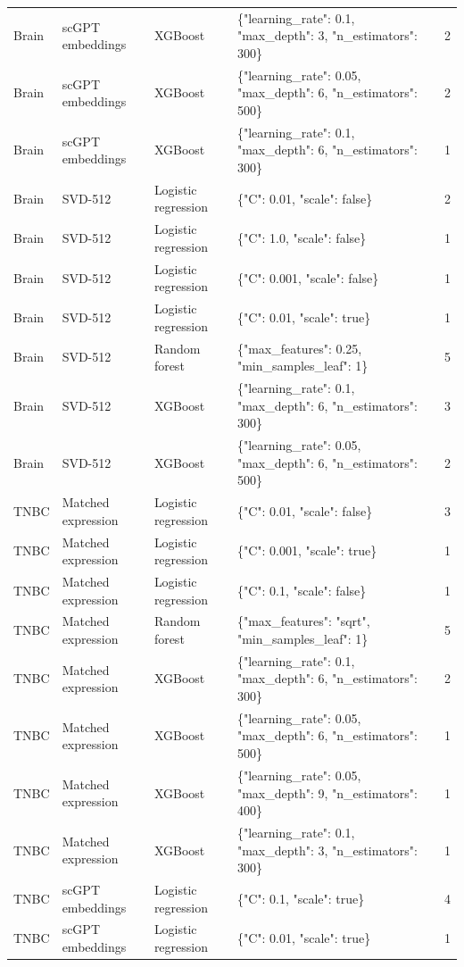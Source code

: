 {\begin{longtable}{lll>{\raggedright\arraybackslash}p{6.8cm}r}
Brain & scGPT embeddings & XGBoost & \{"learning\_rate": 0.1, "max\_depth": 3, "n\_estimators": 300\} & 2 \\
Brain & scGPT embeddings & XGBoost & \{"learning\_rate": 0.05, "max\_depth": 6, "n\_estimators": 500\} & 2 \\
Brain & scGPT embeddings & XGBoost & \{"learning\_rate": 0.1, "max\_depth": 6, "n\_estimators": 300\} & 1 \\
Brain & SVD-512 & Logistic regression & \{"C": 0.01, "scale": false\} & 2 \\
Brain & SVD-512 & Logistic regression & \{"C": 1.0, "scale": false\} & 1 \\
Brain & SVD-512 & Logistic regression & \{"C": 0.001, "scale": false\} & 1 \\
Brain & SVD-512 & Logistic regression & \{"C": 0.01, "scale": true\} & 1 \\
Brain & SVD-512 & Random forest & \{"max\_features": 0.25, "min\_samples\_leaf": 1\} & 5 \\
Brain & SVD-512 & XGBoost & \{"learning\_rate": 0.1, "max\_depth": 6, "n\_estimators": 300\} & 3 \\
Brain & SVD-512 & XGBoost & \{"learning\_rate": 0.05, "max\_depth": 6, "n\_estimators": 500\} & 2 \\
TNBC & Matched expression & Logistic regression & \{"C": 0.01, "scale": false\} & 3 \\
TNBC & Matched expression & Logistic regression & \{"C": 0.001, "scale": true\} & 1 \\
TNBC & Matched expression & Logistic regression & \{"C": 0.1, "scale": false\} & 1 \\
TNBC & Matched expression & Random forest & \{"max\_features": "sqrt", "min\_samples\_leaf": 1\} & 5 \\
TNBC & Matched expression & XGBoost & \{"learning\_rate": 0.1, "max\_depth": 6, "n\_estimators": 300\} & 2 \\
TNBC & Matched expression & XGBoost & \{"learning\_rate": 0.05, "max\_depth": 6, "n\_estimators": 500\} & 1 \\
TNBC & Matched expression & XGBoost & \{"learning\_rate": 0.05, "max\_depth": 9, "n\_estimators": 400\} & 1 \\
TNBC & Matched expression & XGBoost & \{"learning\_rate": 0.1, "max\_depth": 3, "n\_estimators": 300\} & 1 \\
TNBC & scGPT embeddings & Logistic regression & \{"C": 0.1, "scale": true\} & 4 \\
TNBC & scGPT embeddings & Logistic regression & \{"C": 0.01, "scale": true\} & 1 \\

\end{longtable}}
